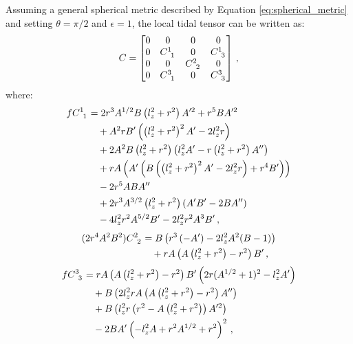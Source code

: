 \documentclass[
    reprint,
    prd,
    nofootinbib,
    amsmath,amssymb,
    aps,
    floatfix,
]{revtex4-2}
\begin{document}
Assuming a general spherical metric described by Equation \ref{eq:spherical_metric} and setting $\theta = \pi/2$ and $\epsilon = 1$, the local tidal tensor can be written as:
\begin{equation}
    C =
    \begin{bmatrix}
        0 & 0         & 0         & 0         \\
        0 & \tensor{C}{^{1}_{1}} & 0         & \tensor{C}{^{1}_{3}} \\
        0 & 0         & \tensor{C}{^{2}_{2}} & 0         \\
        0 & \tensor{C}{^{3}_{1}} & 0         & \tensor{C}{^{3}_{3}}
    \end{bmatrix} \, ,
    \label{eq:tidal_tensor_spherical}
\end{equation}
where:
\begin{equation}
    \begin{split}
        f \tensor{C}{^{1}_{1}} &= 2 r^{3} A^{1/2} B \left( l_{z}^{2} + r^{2} \right) A'^{2} + r^5 B A'^{2} \\
        &\quad+ A^{2} r B' \left( \left( l_{z}^{2} + r^{2} \right)^{2} A'-2 l_{z}^{2} r \right) \\
        &\quad+ 2A^{2} B \left( l_{z}^{2} + r^{2} \right) \left( l_{z}^{2} A'-r \left( l_{z}^{2} + r^{2} \right) A'' \right) \\
        &\quad+ r A \left( A' \left( B \left( \left( l_{z}^{2} + r^{2} \right)^{2} A'-2 l_{z}^{2} r \right) + r^{4} B' \right) \right) \\
        &\quad-2 r^{5} A B A'' \\
        &\quad+ 2 r^{3} A^{3/2} \left( l_{z}^{2} + r^{2} \right) \left( A' B'-2 B A'' \right) \\
        &\quad-4 l_{z}^{2} r^{2} A^{5/2} B'-2 l_{z}^{2} r^{2} A^{3} B' \, ,
    \end{split}
\end{equation}
\begin{equation}
    \begin{split}
        (2 r^{4} A^{2} B^{2}) \tensor{C}{^{2}_{2}} &= B \left( r^3 \left( -A' \right)-2 l_{z}^{2} A^{2} (B-1) \right) \\
        &\quad+r A \left( A \left( l_{z}^{2}+r^{2} \right)-r^{2} \right) B' \, ,
    \end{split}
\end{equation}
\begin{equation}
    \begin{split}
        f \tensor{C}{^{3}_{3}} &= r A \left( A \left( l_{z}^{2}+r^{2} \right)-r^{2}\right) B' \left( 2 r ( A^{1/2} +1 )^{2}-l_{z}^{2} A'\right) \\
        &\quad+B \left( 2 l_{z}^{2} r A \left( A \left( l_{z}^{2}+r^{2} \right)-r^{2} \right) A'' \right) \\
        &\quad+B \left( l_{z}^{2} r \left( r^{2}-A \left( l_{z}^{2}+r^{2} \right) \right) A'^{2} \right) \\
        &\quad-2BA' \left( -l_{z}^{2} A+r^{2} A^{1/2} +r^{2} \right)^{2} \, ,
    \end{split}
\end{equation}
\end{document}
